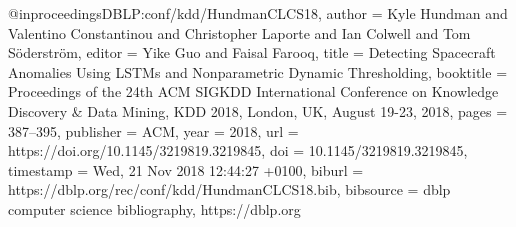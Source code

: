 @inproceedings{DBLP:conf/kdd/HundmanCLCS18,
  author    = {Kyle Hundman and
               Valentino Constantinou and
               Christopher Laporte and
               Ian Colwell and
               Tom S{\"{o}}derstr{\"{o}}m},
  editor    = {Yike Guo and
               Faisal Farooq},
  title     = {Detecting Spacecraft Anomalies Using LSTMs and Nonparametric Dynamic
               Thresholding},
  booktitle = {Proceedings of the 24th {ACM} {SIGKDD} International Conference on
               Knowledge Discovery {\&} Data Mining, {KDD} 2018, London, UK,
               August 19-23, 2018},
  pages     = {387--395},
  publisher = {{ACM}},
  year      = {2018},
  url       = {https://doi.org/10.1145/3219819.3219845},
  doi       = {10.1145/3219819.3219845},
  timestamp = {Wed, 21 Nov 2018 12:44:27 +0100},
  biburl    = {https://dblp.org/rec/conf/kdd/HundmanCLCS18.bib},
  bibsource = {dblp computer science bibliography, https://dblp.org}
}